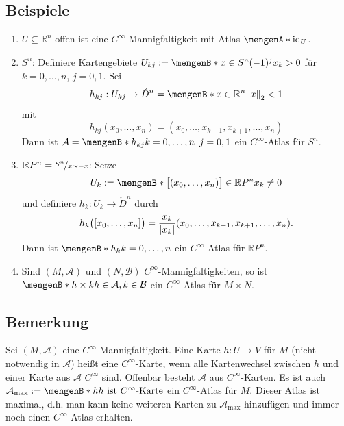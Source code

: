 \subsection[Beispiele für differenzierbare Mannigfaltigkeiten]{Beispiele} %
\label{sub:154}
\begin{enumerate}[(1)]
	\item $U \subseteq \mathds{R}^n$ offen ist eine $C^\infty$-Mannigfaltigkeit mit Atlas $\set{\id_U}$.
	\item $S^n$: Definiere Kartengebiete $U_{kj} := \set[x \in S^n]{(-1)^j x_k > 0}$ für $k=0, \ldots, n$, $j=0,1$. Sei 
	\[
		h_{kj} : U_{kj} \to \mathring{D}^n = \set[x \in \mathds{R}^n]{\norm[2]{x} < 1 } 
	\]
	mit 
	\[
		h_{kj} (x_0, \ldots , x_n) = (x_0, \ldots , x_{k-1}, x_{k+1}, \ldots , x_n)
	\]
	Dann ist $\mathcal{A} = \set[h_{kj}]{k=0, \ldots ,n \enspace j=0,1}$ ein $C^\infty$-Atlas für $S^n$.
	\item \label{154:enum:3} $\mathds{R}P^n = \nicefrac{S^n}{x \sim -x}$: Setze 
	\[
		U_k := \set[{\benbrace[\big]{(x_0, \ldots, x_n)} \in \mathds{R}P^n}]{x_k \not= 0} 
	\]
	und definiere $h_k : U_k \to \mathring{D}^n$ durch
	\[
		h_k \enbrace[\big]{[x_0, \ldots, x_n]} = \frac{x_k}{\abs*{x_k}} \enbrace*{x_0, \ldots , x_{k-1}, x_{k+1}, \ldots, x_n} .  
	\]
	Dann ist $\set[h_k]{k=0,\ldots , n}$ ein $C^\infty$-Atlas für $\mathds{R}P^n$.
	\item Sind $(M, \mathcal{A})$ und $(N, \mathcal{B})$ $C^\infty$-Mannigfaltigkeiten, so ist $\set[h \times k]{h \in \mathcal{A}, k \in \mathcal{B}}$ ein
	$C^\infty$-Atlas für $M \times N$.
\end{enumerate}

\subsection[Bemerkung: Maximaler Atlas]{Bemerkung} %
\label{sub:155}
Sei $(M,\mathcal{A})$ eine $C^\infty$-Mannigfaltigkeit. Eine Karte $h : U \to V$ für $M$ (nicht notwendig in $\mathcal{A}$) heißt eine $C^\infty$-Karte, wenn alle 
Kartenwechsel zwischen $h$ und einer Karte aus $\mathcal{A}$ $C^\infty$ sind. Offenbar besteht $\mathcal{A}$ aus $C^\infty$-Karten. Es ist auch 
$\mathcal{A}_\mathrm{max} := \set[h]{h \text{ ist $C^\infty$-Karte}}$ ein $C^\infty$-Atlas für $M$. Dieser Atlas ist maximal, d.h. man kann keine weiteren Karten zu 
$\mathcal{A}_\mathrm{max}$ hinzufügen und immer noch einen $C^\infty$-Atlas erhalten.

